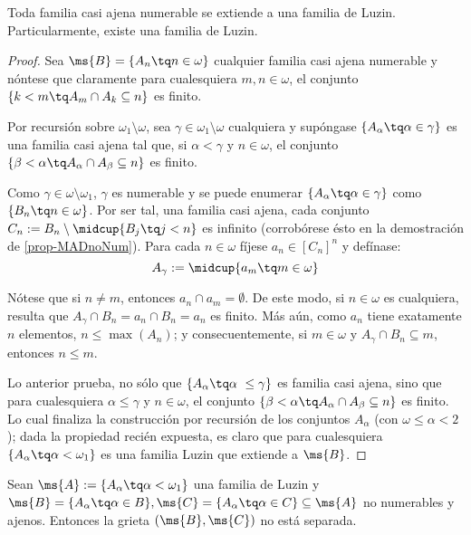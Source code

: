 	\begin{proposicion}\label{pro-LuzinExisten}
		Toda familia casi ajena numerable se extiende a una familia de Luzin. Particularmente, existe una familia de Luzin.
	\end{proposicion}
	\begin{proof}
		Sea $\ms{B}=\{A_n \tq n \in \omega\}$ cualquier familia casi ajena numerable y nóntese que claramente para cualesquiera $m,n \in \omega$, el conjunto $ \{ k<m \tq A_m \cap A_k \subseteq n \} $ es finito.
	
		Por recursión sobre $\omega_1 \setminus \omega$, sea $\gamma \in \omega_1 \setminus \omega$ cualquiera y supóngase $\{A_\alpha \tq \alpha \in \gamma\}$ es una familia casi ajena tal que, si $\alpha<\gamma$ y $n \in \omega$, el conjunto $ \{ \beta<\alpha \tq A_\alpha \cap A_\beta \subseteq n \} $ es finito.

		Como $\gamma \in \omega \setminus \omega_1$, $\gamma$ es numerable y se puede enumerar $\{A_\alpha \tq \alpha \in \gamma\}$ como $\{B_n \tq n\in \omega\}$. Por ser tal, una familia casi ajena, cada conjunto $C_n:=B_n \setminus \midcup\{ B_j \tq j<n \}$ es infinito (corrobórese ésto en la demostración de \ref{prop-MADnoNum}). Para cada $n \in \omega$ fíjese $a_n \in [C_n]^n$ y defínase:
		$$ A_\gamma:=\midcup\{a_m \tq m \in \omega\} $$
		
		Nótese que si $n \neq m$, entonces $a_n \cap a_m = \emptyset$. De este modo, si $n \in \omega$ es cualquiera, resulta que $A_\gamma \cap B_n = a_n \cap B_n = a_n$ es finito. Más aún, como $a_n$ tiene exatamente $n$ elementos, $n \leq \max(A_n)$; y consecuentemente, si $m \in \omega$ y $A_\gamma \cap B_n \subseteq m$, entonces $n \leq m$.
		
		Lo anterior prueba, no sólo que $\{A_\alpha \tq \alpha \ \leq \gamma\}$ es familia casi ajena, sino que para cualesquiera $\alpha\leq \gamma$ y $n \in \omega$, el conjunto $ \{ \beta<\alpha \tq A_\alpha \cap A_\beta \subseteq n \} $ es finito. Lo cual finaliza la construcción por recursión de los conjuntos $A_\alpha$ (con $\omega \leq \alpha<2$); dada la propiedad recién expuesta, es claro que para cualesquiera $\{A_\alpha \tq \alpha < \omega_1 \}$ es una familia Luzin que extiende a $\ms{B}$.
	\end{proof} 

	\begin{proposicion}\label{prop-LuzinSeparadas}
		Sean $\ms{A}:=\{A_\alpha \tq \alpha < \omega_1 \}$ una familia de Luzin y $\ms{B}=\{A_\alpha \tq \alpha \in B\},\ms{C}=\{A_\alpha \tq \alpha \in C\} \subseteq \ms{A}$ no numerables y ajenos. Entonces la grieta $(\ms{B},\ms{C})$ no está separada.
	\end{proposicion}

